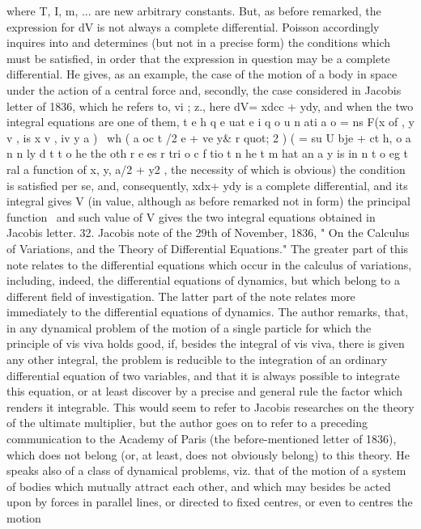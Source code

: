 \documentclass[11pt,a4paper]{book}
\begin{document}

where T, I, m, ... are new arbitrary constants. But, as before remarked, the expression
for dV is not always a complete differential. Poisson accordingly inquires into and
determines (but not in a precise form) the conditions which must be satisfied, in order
that the expression in question may be a complete differential. He gives, as an
example, the case of the motion of a body in space under the action of a central
force and, secondly, the case considered in Jacobis letter of 1836, which he refers
to, vi ; z., here dV= xdcc + ydy, and when the two integral equations are one of them,
t e h q e uat e i q o u n ati a o = ns F(x of , y v , is x v , iv y a ) \ wh ( a oc t /2 e + ve y& r quot; 2 ) ( = su U bje + ct h, o a n n ly d t t o he the oth r e es r tri o c f tio t n he t m hat an a y is in n t o eg t ral a
function of x, y, a/2 + y2 , the necessity of which is obvious) the condition is satisfied
per se, and, consequently, xdx+ ydy is a complete differential, and its integral gives
V
(in value, although as before remarked not in form) the principal function \ and
such value of V gives the two integral equations obtained in Jacobis letter.
32. Jacobis note of the 29th of November, 1836, " On the Calculus of Variations,
and the Theory of Differential Equations." The greater part of this note relates to
the differential equations which occur in the calculus of variations, including, indeed,
the differential equations of dynamics, but which belong to a different field of
investigation. The latter part of the note relates more immediately to the differential
equations of dynamics. The author remarks, that, in any dynamical problem of the
motion of a single particle for which the principle of vis viva holds good, if, besides
the integral of vis viva, there is given any other integral, the problem is reducible
to the integration of an ordinary differential equation of two variables, and that it is
always possible to integrate this equation, or at least discover by a precise and general
rule the factor which renders it integrable. This would seem to refer to Jacobis
researches on the theory of the ultimate multiplier, but the author goes on to refer
to a preceding communication to the Academy of Paris (the before-mentioned letter
of 1836), which does not belong (or, at least, does not obviously belong) to this theory.
He speaks also of a class of dynamical problems, viz. that of the motion of a system
of bodies which mutually attract each other, and which may besides be acted upon
by forces in parallel lines, or directed to fixed centres, or even to centres the motion
\end{document}
